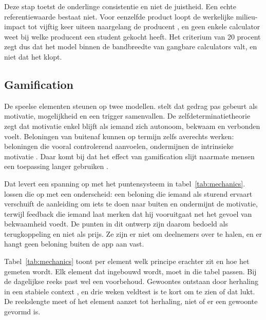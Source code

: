\documentclass{hogent-article}
\begin{document}
    Deze stap toetst de onderlinge consistentie en niet de juistheid. Een echte
    referentiewaarde bestaat niet. Voor eenzelfde product loopt de werkelijke
    milieu-impact tot vijftig keer uiteen naargelang de producent
    \autocite{PooreNemecek2018}, en geen enkele calculator weet bij welke producent
    een student gekocht heeft. Het criterium van 20 procent zegt dus dat het model
    binnen de bandbreedte van gangbare calculators valt, en niet dat het klopt.
    
    \subsection{Gamification}%
    \label{ssec:gamification}
    
    De speelse elementen steunen op twee modellen. \textcite{Fogg2009} stelt dat
    gedrag pas gebeurt als motivatie, mogelijkheid en een trigger samenvallen. De
    zelfdeterminatietheorie \autocite{RyanDeci2000} zegt dat motivatie enkel blijft
    als iemand zich autonoom, bekwaam en verbonden voelt. Beloningen van buitenaf
    kunnen op termijn zelfs averechts werken: beloningen die vooral controlerend
    aanvoelen, ondermijnen de intrinsieke motivatie \autocite{RyanDeci2000}. Daar
    komt bij dat het effect van gamification slijt naarmate mensen een toepassing
    langer gebruiken \autocite{KoivistoHamari2014}.
    
    Dat levert een spanning op met het puntensysteem in tabel~\ref{tab:mechanics}.
    \textcite{RyanDeci2000} lossen die op met een onderscheid: een beloning die
    iemand als sturend ervaart verschuift de aanleiding om iets te doen naar buiten
    en ondermijnt de motivatie, terwijl feedback die iemand laat merken dat hij
    vooruitgaat net het gevoel van bekwaamheid voedt. De punten in dit ontwerp zijn
    daarom bedoeld als terugkoppeling en niet als prijs. Ze zijn er niet om
    deelnemers over te halen, en er hangt geen beloning buiten de app aan vast.
    
    Tabel~\ref{tab:mechanics} toont per element welk principe erachter zit en hoe
    het gemeten wordt. Elk element dat ingebouwd wordt, moet in die tabel passen.
    Bij de dagelijkse reeks past wel een voorbehoud. Gewoontes ontstaan door
    herhaling in een stabiele context \autocite{WoodRunger2016}, en drie weken
    veldtest is te kort om te zien of dat lukt. De reekslengte meet of het element
    aanzet tot herhaling, niet of er een gewoonte gevormd is.
    
\end{document}
